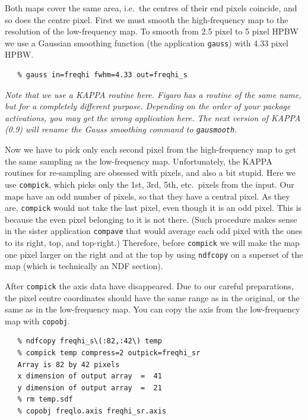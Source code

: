 \documentclass[11pt]{article}
\newcommand{\htmlref}[2]{#1}
\newcommand{\xref}[3]{#1}
\begin{document}
   Both maps cover the same area, i.e.\ the centres of their end pixels
   coincide, and so does the centre pixel.
   First we must smooth the high-frequency map to the resolution of the
   low-frequency map. To smooth from 2.5 pixel to 5 pixel HPBW we
   use a Gaussian smoothing function (the application
{\tt \xref{gauss}{sun95}{GAUSMOOTH}})
   with 4.33 pixel HPBW.

\begin{verbatim}
   % gauss in=freqhi fwhm=4.33 out=freqhi_s
\end{verbatim}

   {\it Note that we use a
\xref{KAPPA}{sun95}{}
   routine here.
\xref{Figaro}{sun86}{}
   has a routine of the same name, but for a completely different
   purpose. Depending on the order of your
\htmlref{package activations,}{start}
   you may get the wrong application here.
   The next version of KAPPA (0.9) will rename the Gauss smoothing
   command to\/ \tt gausmooth}.

   Now we have to pick only each second pixel from the high-frequency
   map to get the same sampling as the low-frequency map. Unfortunately,
   the KAPPA routines for re-sampling are obsessed with pixels, and also
   a bit stupid. Here we use
{\tt \xref{compick}{sun95}{COMPICK}},
   which picks only
   the 1st, 3rd, 5th, etc.\ pixels from the input. Our maps have an
   odd number of pixels, so that they have a central pixel. As they are,
   {\tt compick} would not take the last pixel, even though it is an
   odd pixel. This is because the even pixel belonging to it is
   not there. (Such procedure makes sense in the sister application
{\tt \xref{compave}{sun95}{COMPAVE}}
   that would average each odd pixel with the ones to
   its right, top, and top-right.)
   Therefore, before {\tt compick} we
   will make the map one pixel larger on the right and at the top by
   using
{\tt \xref{ndfcopy}{sun95}{NDFCOPY}}
   on a superset of the map (which is technically an
\htmlref{NDF section).}{glossndfsection}

   After {\tt compick} the axis data have disappeared. Due to our
   careful preparations, the pixel centre coordinates should have the
   same range as in the original, or the same as in the low-frequency
   map. You can copy the axis from the low-frequency map with
{\tt \xref{copobj}{sun86}{COPOBJ}}.

\begin{verbatim}
   % ndfcopy freqhi_s\(:82,:42\) temp
   % compick temp compress=2 outpick=freqhi_sr
   Array is 82 by 42 pixels
   x dimension of output array  =  41
   y dimension of output array  =  21
   % rm temp.sdf
   % copobj freqlo.axis freqhi_sr.axis
\end{verbatim}
\end{document}
